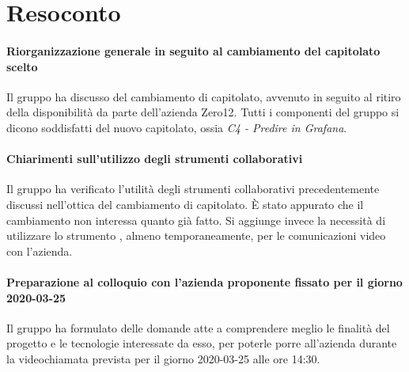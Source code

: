 \documentclass{article}
\begin{document}
\section{Resoconto}%
\label{resoconto}
\paragraph*{Riorganizzazione generale in seguito al cambiamento del capitolato scelto}
Il gruppo ha discusso del cambiamento di capitolato, avvenuto in seguito al ritiro della disponibilità da parte dell'azienda Zero12. Tutti i componenti del gruppo si dicono soddisfatti del nuovo capitolato, ossia \emph{C4 - Predire in Grafana}.

\paragraph*{Chiarimenti sull'utilizzo degli strumenti collaborativi}
Il gruppo ha verificato l'utilità degli strumenti collaborativi precedentemente discussi nell'ottica del cambiamento di capitolato. È stato appurato che il cambiamento non interessa quanto già fatto. Si aggiunge invece la necessità di utilizzare lo strumento , almeno temporaneamente, per le comunicazioni video con l'azienda.

\paragraph*{Preparazione al colloquio con l'azienda proponente fissato per il giorno 2020-03-25}
Il gruppo ha formulato delle domande atte a comprendere meglio le finalità del progetto e le tecnologie interessate da esso, per poterle porre all'azienda durante la videochiamata prevista per il giorno 2020-03-25 alle ore 14:30.
\end{document}
